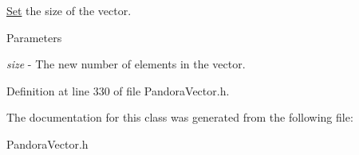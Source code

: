 \hyperlink{classPandora_1_1Utils_1_1Set}{Set} the size of the vector. 
\begin{DoxyParams}{Parameters}
\item[{\em size}]-\/ The new number of elements in the vector. \end{DoxyParams}


Definition at line 330 of file PandoraVector.h.

The documentation for this class was generated from the following file:\begin{DoxyCompactItemize}
\item 
PandoraVector.h\end{DoxyCompactItemize}
